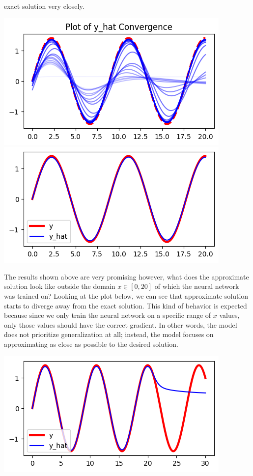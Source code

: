 \documentclass[12pt]{article}
\begin{document}
\begin{description}
    exact solution very closely. \\
    \begin{minipage}{\linewidth}
        \centering
        \includegraphics[scale=.5]{images/figure10.png}
        \includegraphics[scale=.5]{images/figure11.png}
    \end{minipage}
    The results shown above are very promising however, what does the
    approximate solution look like outside the domain $x\in[0, 20]$ of which
    the neural network was trained on? Looking at the plot below, we can see
    that approximate solution starts to diverge away from the exact solution.
    This kind of behavior is expected because since we only train the neural
    network on a specific range of $x$ values, only those values should have
    the correct gradient. In other words, the model does not prioritize
    generalization at all; instead, the model focuses on approximating as close
    as possible to the desired solution. \\
    \begin{minipage}{\linewidth}
        \centering
        \includegraphics[scale=.5]{images/figure12.png}

\end{minipage}
\end{description}
\end{document}
